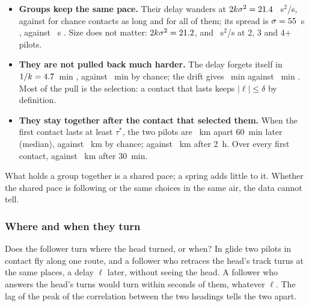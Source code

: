 \begin{itemize}
  \item \textbf{Groups keep the same pace.} Their delay wanders at $2k\sigma^2=21.4$ \StQRealBand~s$^2$/s,
        against \StQChanceLong{} \StQChanceLongBand{} for chance contacts as long and \StQChance{}
        \StQChanceBand{} for all of them; its spread is $\sigma=55$~s \StSigmaRealBand, against
        \StSigmaChance~s \StSigmaChanceBand. Size does not matter: $2k\sigma^2=21.2$, \StQThree{} and
        \StQFour~s$^2$/s at 2, 3 and 4+ pilots.
  \item \textbf{They are not pulled back much harder.} The delay forgets itself in $1/k=4.7$~min
        \StOuRealBand, against \StOuChance~min \StOuChanceBand{} by chance; the drift gives \StDriftReal~min
        \StDriftRealBand{} against \StDriftChance~min \StDriftChanceBand. Most of the pull is the
        selection: a contact that lasts keeps $|\ell|\le\delta$ by definition.
  \item \textbf{They stay together after the contact that selected them.} When the first contact lasts
        at least $\tau^*$, the two pilots are \StSepRealLongSixty~km apart 60~min later (median), against
        \StSepChanceLongSixty~km by chance; \StSepRealLongTwoHours{} against \StSepChanceLongTwoHours~km
        after 2~h. Over every first contact, \StSepRealThirty{} against \StSepChanceThirty~km after 30~min.
\end{itemize}
What holds a group together is a shared pace; a spring adds little to it. Whether the shared pace
is following or the same choices in the same air, the data cannot tell.

\subsubsection{Where and when they turn}\label{sec:headings}

Does the follower turn where the head turned, or when? In glide two pilots in contact fly along
one route, and a follower who retraces the head's track turns at the same places, a delay $\ell$
later, without seeing the head. A follower who answers the head's turns would turn within seconds
of them, whatever $\ell$. The lag of the peak of the correlation between the two headings tells the
two apart.

